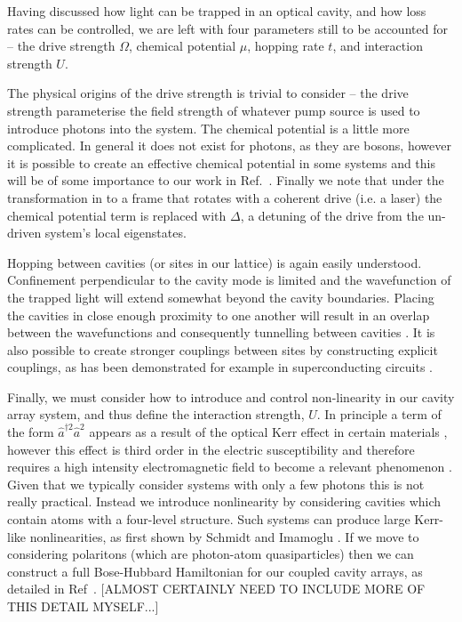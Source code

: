 Having discussed how light can be trapped in an optical cavity, and how loss rates can be controlled, we are left with four parameters still to be accounted for -- the drive strength \(\Omega\), chemical potential \(\mu\), hopping rate \(t\), and interaction strength \(U\).

The physical origins of the drive strength is trivial to consider -- the drive strength parameterise the field strength of whatever pump source is used to introduce photons into the system. The chemical potential is a little more complicated. In general it does not exist for photons, as they are bosons, however it is possible to create an effective chemical potential in some systems \cite{HAT15,MOHSS17,LBSRFCC17} and this will be of some importance to our work in Ref.~\cite{BH17}. Finally we note that under the transformation in to a frame that rotates with a coherent drive (i.e. a laser) the chemical potential term is replaced with \(\Delta\), a detuning of the drive from the un-driven system's local eigenstates. 

Hopping between cavities (or sites in our lattice) is again easily understood. Confinement perpendicular to the cavity mode is limited and the wavefunction of the trapped light will extend somewhat beyond the cavity boundaries. Placing the cavities in close enough proximity to one another will result in an overlap between the wavefunctions and consequently tunnelling between cavities \cite{HBP06,HBP08}. It is also possible to create stronger couplings between sites by constructing explicit couplings, as has been demonstrated for example in superconducting circuits \cite{MajerEA}.

Finally, we must consider how to introduce and control non-linearity in our cavity array system, and thus define the interaction strength, \(U\). In principle a term of the form \(\hat{a}^{\dagger 2}\hat{a}^{2}\) appears as a result of the optical Kerr effect in certain materials \cite{KY86}, however this effect is third order in the electric susceptibility and therefore requires a high intensity electromagnetic field to become a relevant phenomenon \cite{Boyd_KerrNL}. Given that we typically consider systems with only a few photons this is not really practical. Instead we introduce nonlinearity by considering cavities which contain atoms with a four-level structure. Such systems can produce large Kerr-like nonlinearities, as first shown by Schmidt and Imamoglu \cite{SI96}. If we move to considering polaritons (which are photon-atom quasiparticles) then we can construct a full Bose-Hubbard Hamiltonian for our coupled cavity arrays, as detailed in Ref~\cite{HBP08}. [ALMOST CERTAINLY NEED TO INCLUDE MORE OF THIS DETAIL MYSELF...]

